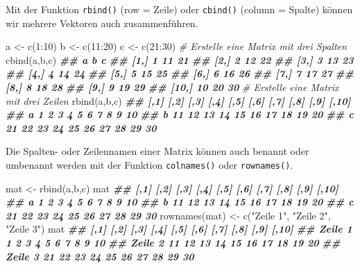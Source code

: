 \documentclass[
]{article}
\newenvironment{Shaded}{\begin{snugshade}}{\end{snugshade}}
\newcommand{\CommentTok}[1]{\textcolor[rgb]{0.56,0.35,0.01}{\textit{#1}}}
\newcommand{\DecValTok}[1]{\textcolor[rgb]{0.00,0.00,0.81}{#1}}
\newcommand{\DocumentationTok}[1]{\textcolor[rgb]{0.56,0.35,0.01}{\textbf{\textit{#1}}}}
\newcommand{\FunctionTok}[1]{\textcolor[rgb]{0.00,0.00,0.00}{#1}}
\newcommand{\NormalTok}[1]{#1}
\newcommand{\OtherTok}[1]{\textcolor[rgb]{0.56,0.35,0.01}{#1}}
\newcommand{\SpecialCharTok}[1]{\textcolor[rgb]{0.00,0.00,0.00}{#1}}
\newcommand{\StringTok}[1]{\textcolor[rgb]{0.31,0.60,0.02}{#1}}
\begin{document}
Mit der Funktion \texttt{rbind()} (row = Zeile) oder \texttt{cbind()} (column = Spalte) können wir mehrere Vektoren auch zusammenführen.

\begin{Shaded}
\begin{Highlighting}[]
\NormalTok{a }\OtherTok{\textless{}{-}} \FunctionTok{c}\NormalTok{(}\DecValTok{1}\SpecialCharTok{:}\DecValTok{10}\NormalTok{)}
\NormalTok{b }\OtherTok{\textless{}{-}} \FunctionTok{c}\NormalTok{(}\DecValTok{11}\SpecialCharTok{:}\DecValTok{20}\NormalTok{)}
\NormalTok{c }\OtherTok{\textless{}{-}} \FunctionTok{c}\NormalTok{(}\DecValTok{21}\SpecialCharTok{:}\DecValTok{30}\NormalTok{)}
\CommentTok{\# Erstelle eine Matrix mit drei Spalten}
\FunctionTok{cbind}\NormalTok{(a,b,c)}
\DocumentationTok{\#\#        a  b  c}
\DocumentationTok{\#\#  [1,]  1 11 21}
\DocumentationTok{\#\#  [2,]  2 12 22}
\DocumentationTok{\#\#  [3,]  3 13 23}
\DocumentationTok{\#\#  [4,]  4 14 24}
\DocumentationTok{\#\#  [5,]  5 15 25}
\DocumentationTok{\#\#  [6,]  6 16 26}
\DocumentationTok{\#\#  [7,]  7 17 27}
\DocumentationTok{\#\#  [8,]  8 18 28}
\DocumentationTok{\#\#  [9,]  9 19 29}
\DocumentationTok{\#\# [10,] 10 20 30}
\CommentTok{\# Erstelle eine Matrix mit drei Zeilen}
\FunctionTok{rbind}\NormalTok{(a,b,c)}
\DocumentationTok{\#\#   [,1] [,2] [,3] [,4] [,5] [,6] [,7] [,8] [,9] [,10]}
\DocumentationTok{\#\# a    1    2    3    4    5    6    7    8    9    10}
\DocumentationTok{\#\# b   11   12   13   14   15   16   17   18   19    20}
\DocumentationTok{\#\# c   21   22   23   24   25   26   27   28   29    30}
\end{Highlighting}
\end{Shaded}

Die Spalten- oder Zeilennamen einer Matrix können auch benannt oder umbenannt werden mit der Funktion \texttt{colnames()} oder \texttt{rownames()}.

\begin{Shaded}
\begin{Highlighting}[]
\NormalTok{mat }\OtherTok{\textless{}{-}} \FunctionTok{rbind}\NormalTok{(a,b,c)}
\NormalTok{mat}
\DocumentationTok{\#\#   [,1] [,2] [,3] [,4] [,5] [,6] [,7] [,8] [,9] [,10]}
\DocumentationTok{\#\# a    1    2    3    4    5    6    7    8    9    10}
\DocumentationTok{\#\# b   11   12   13   14   15   16   17   18   19    20}
\DocumentationTok{\#\# c   21   22   23   24   25   26   27   28   29    30}
\FunctionTok{rownames}\NormalTok{(mat) }\OtherTok{\textless{}{-}} \FunctionTok{c}\NormalTok{(}\StringTok{"Zeile 1"}\NormalTok{, }\StringTok{"Zeile 2"}\NormalTok{, }\StringTok{"Zeile 3"}\NormalTok{)}
\NormalTok{mat}
\DocumentationTok{\#\#         [,1] [,2] [,3] [,4] [,5] [,6] [,7] [,8] [,9] [,10]}
\DocumentationTok{\#\# Zeile 1    1    2    3    4    5    6    7    8    9    10}
\DocumentationTok{\#\# Zeile 2   11   12   13   14   15   16   17   18   19    20}
\DocumentationTok{\#\# Zeile 3   21   22   23   24   25   26   27   28   29    30}
\end{Highlighting}
\end{Shaded}
\end{document}
